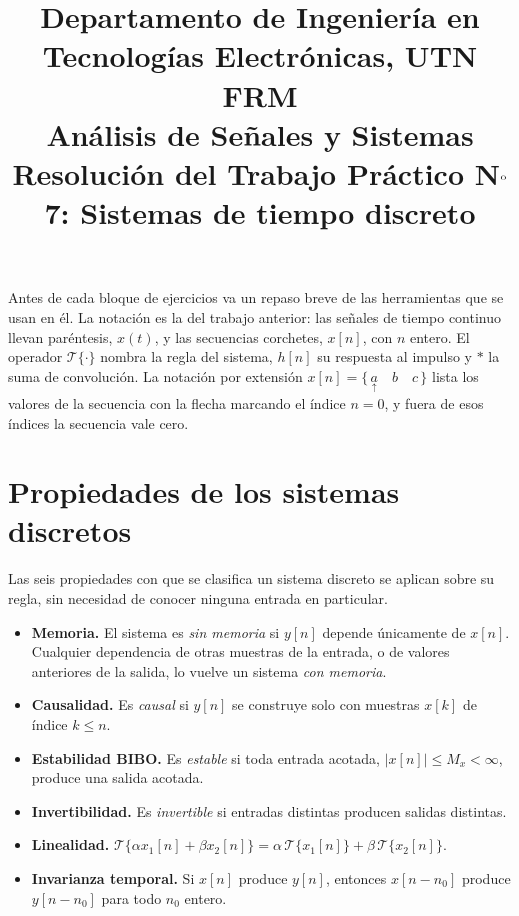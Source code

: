 \documentclass[10pt,a4paper]{article}
\title{%
	{\normalsize Departamento de Ingeniería en Tecnologías Electrónicas, UTN FRM}\\[0.1cm]
	{\large Análisis de Señales y Sistemas}\\[0.15cm]
	{\normalsize Resolución del Trabajo Práctico N$^{\text o}$7: Sistemas de tiempo discreto}%
}
\author{}
\date{}
\newcommand{\tema}[1]{%
  \bigskip
  \section*{#1}
  \vspace{-0.6em}
}
\begin{document}
	\maketitle
	\thispagestyle{fancy}

	\label{sec:resolucion_tp7}

	\noindent
	Antes de cada bloque de ejercicios va un repaso breve de las herramientas que se usan
	en él. La notación es la del trabajo anterior: las señales de tiempo continuo llevan
	paréntesis, $x(t)$, y las secuencias corchetes, $x[n]$, con $n$ entero. El operador
	$\mathcal{T}\{\cdot\}$ nombra la regla del sistema, $h[n]$ su respuesta al impulso y
	$*$ la suma de convolución. La notación por extensión
	$x[n]=\{\,\underset{\uparrow}{a} \quad b \quad c\,\}$ lista los valores de la
	secuencia con la flecha marcando el índice $n=0$, y fuera de esos índices la
	secuencia vale cero.

	\tema{Propiedades de los sistemas discretos}

	Las seis propiedades con que se clasifica un sistema discreto se aplican sobre su
	regla, sin necesidad de conocer ninguna entrada en particular.

	\begin{itemize}[nosep]
		\item \textbf{Memoria.} El sistema es \emph{sin memoria} si $y[n]$ depende
		      únicamente de $x[n]$. Cualquier dependencia de otras muestras de la entrada,
		      o de valores anteriores de la salida, lo vuelve un sistema \emph{con memoria}.
		\item \textbf{Causalidad.} Es \emph{causal} si $y[n]$ se construye solo con
		      muestras $x[k]$ de índice $k \le n$.
		\item \textbf{Estabilidad BIBO.} Es \emph{estable} si toda entrada acotada,
		      $|x[n]| \le M_x < \infty$, produce una salida acotada.
		\item \textbf{Invertibilidad.} Es \emph{invertible} si entradas distintas producen
		      salidas distintas.
		\item \textbf{Linealidad.}
		      $\mathcal{T}\{\alpha x_1[n] + \beta x_2[n]\}
		      = \alpha\,\mathcal{T}\{x_1[n]\} + \beta\,\mathcal{T}\{x_2[n]\}$.
		\item \textbf{Invarianza temporal.} Si $x[n]$ produce $y[n]$, entonces
		      $x[n-n_0]$ produce $y[n-n_0]$ para todo $n_0$ entero.
	\end{itemize}
\end{document}
